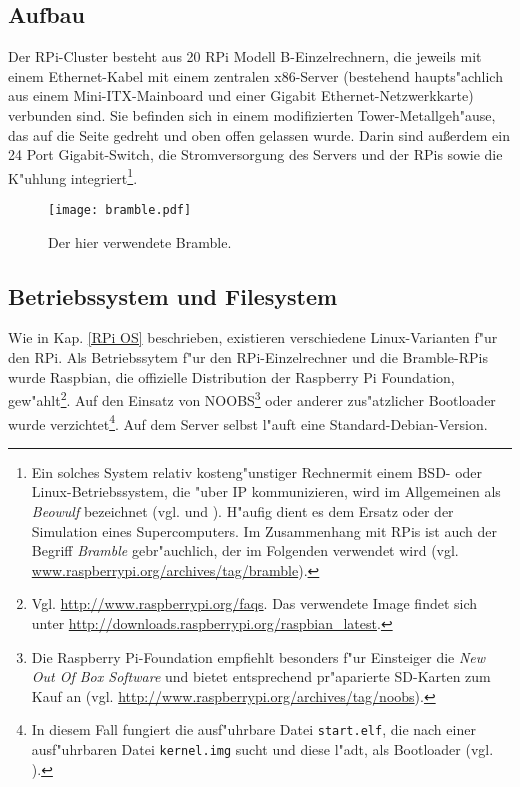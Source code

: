 \subsection{Aufbau}\label{Bramble Hardware}
Der RPi-Cluster besteht aus 20 RPi Modell B-Einzelrechnern, die jeweils mit einem Ethernet-Kabel mit einem zentralen x86-Server (bestehend haupts"achlich aus einem Mini-ITX-Mainboard und einer Gigabit Ethernet-Netzwerkkarte) verbunden sind. Sie befinden sich in einem modifizierten Tower-Metallgeh"ause, das auf die Seite gedreht und oben offen gelassen wurde. Darin sind au\ss erdem ein 24 Port Gigabit-Switch, die Stromversorgung des Servers und der RPis sowie die K"uhlung integriert\footnote{Ein solches System relativ kosteng"unstiger Rechnermit einem BSD- oder Linux-Betriebssystem, die "uber IP kommunizieren, wird im Allgemeinen als \textit{Beowulf} bezeichnet (vgl. \cite{kie01} und \cite{kli13}). H"aufig dient es dem Ersatz oder der Simulation eines Supercomputers. Im Zusammenhang mit RPis ist auch der Begriff \textit{Bramble} gebr"auchlich, der im Folgenden verwendet wird (vgl. \url{www.raspberrypi.org/archives/tag/bramble}).}. 
\begin{figure}[htb]
	\centering
	\texttt{[image: bramble.pdf]}\\ 
	\caption{Der hier verwendete Bramble.}\label{fig:Bramble}
\end{figure}


\subsection{Betriebssystem und Filesystem}\label{Bramble Systemarchitektur} 

Wie in Kap. \ref{RPi OS} beschrieben, existieren verschiedene Linux-Varianten f"ur den RPi. Als Betriebssytem f"ur den RPi-Einzelrechner und die Bramble-RPis wurde Raspbian, die offizielle Distribution der Raspberry Pi Foundation, gew"ahlt\footnote{Vgl. \url{http://www.raspberrypi.org/faqs}. Das verwendete Image findet sich unter \url{http://downloads.raspberrypi.org/raspbian_latest}.}. Auf den Einsatz von NOOBS\footnote{Die Raspberry Pi-Foundation empfiehlt besonders f"ur Einsteiger die \textit{New Out Of Box Software} und bietet entsprechend pr"aparierte SD-Karten zum Kauf an (vgl. \url{http://www.raspberrypi.org/archives/tag/noobs}).} oder anderer zus"atzlicher Bootloader wurde verzichtet\footnote{In diesem Fall fungiert die ausf"uhrbare Datei \texttt{start.elf}, die nach einer ausf"uhrbaren Datei \texttt{kernel.img} sucht und diese l"adt, als Bootloader (vgl. \cite{kli13}).}. Auf dem Server selbst l"auft eine Standard-Debian-Version. 

